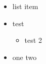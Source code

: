 \documentclass{article}
\begin{document}
\begin{itemize}
\item list item
\item test
\begin{itemize}
\item test 2
\end{itemize}
\item one two
\end{itemize}
\end{document}
